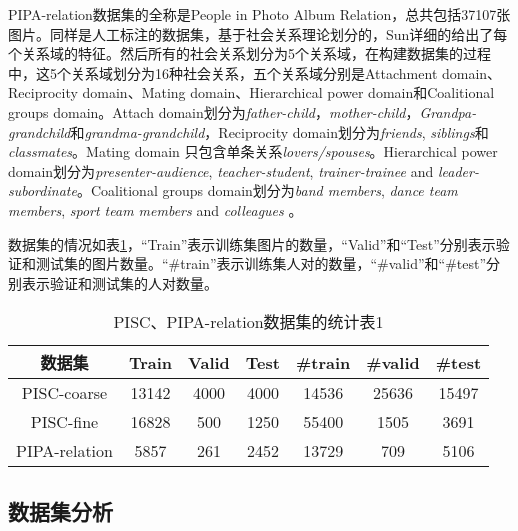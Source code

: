 PIPA-relation数据集的全称是People in Photo Album Relation，总共包括37107张图片。同样是人工标注的数据集，基于社会关系理论\cite{bugental2000acquisition}划分的，Sun\cite{sun2017a}详细的给出了每个关系域的特征。然后所有的社会关系划分为5个关系域，在构建数据集的过程中，这5个关系域划分为16种社会关系，五个关系域分别是Attachment domain、Reciprocity domain、Mating domain、Hierarchical power domain和Coalitional groups domain。Attach domain划分为{\it father-child}，{\it mother-child}，{\it Grandpa-grandchild}和{\it grandma-grandchild}，Reciprocity domain划分为{\it friends}, {\it siblings}和{\it classmates}。Mating domain 只包含单条关系{\it lovers/spouses}。Hierarchical power domain划分为{\it presenter-audience}, {\it teacher-student}, {\it trainer-trainee} and {\it leader-subordinate}。Coalitional groups domain划分为{\it band members}, {\it dance team members}, {\it sport team members} and {\it colleagues} 。

数据集的情况如表\ref{tab:exp-sta-one}，``Train''表示训练集图片的数量，``Valid''和``Test''分别表示验证和测试集的图片数量。``\#train''表示训练集人对的数量，``\#valid''和``\#test''分别表示验证和测试集的人对数量。
\begin{table}[htpb]
  \centering
  \caption{PISC、PIPA-relation数据集的统计表1}
  \label{tab:exp-sta-one}
  \setlength{\tabcolsep}{4.5mm}
  \begin{tabular}{c|c|c|c|c|c|c}
    \toprule
    数据集 & Train & Valid & Test & \#train  &  \#valid &  \#test  \\
    \midrule
    PISC-coarse & 13142 & 4000 & 4000 & 14536 & 25636 & 15497   \\
    \midrule
    PISC-fine &  16828 & 500 & 1250 & 55400 & 1505 & 3691 \\
    \midrule
    PIPA-relation & 5857 & 261 & 2452 & 13729 & 709 & 5106 \\
    \bottomrule
  \end{tabular}
\end{table}

\subsection{数据集分析} \label{sec:exp-dataset-ana}

